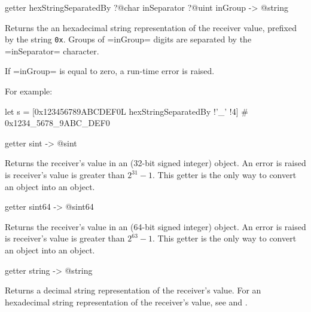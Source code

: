 
\begin{galgas}
getter hexStringSeparatedBy ?@char inSeparator ?@uint inGroup -> @string
\end{galgas}

Returns the an hexadecimal string representation of the receiver value, prefixed by the string \texttt{0x}. Groups of \ggs=inGroup= digits are separated by the \ggs=inSeparator= character.

If \ggs=inGroup= is equal to zero, a run-time error is raised.

For example:
\begin{galgas}
let s = [0x123456789ABCDEF0L hexStringSeparatedBy !'_' !4] # 0x1234_5678_9ABC_DEF0
\end{galgas}






\begin{galgas}
getter sint -> @sint
\end{galgas}

Returns the receiver's value in an  (32-bit signed integer) object. An error is raised is receiver's value is greater than $2^{31}-1$. This getter is the only way to convert an  object into an  object.




\begin{galgas}
getter sint64 -> @sint64
\end{galgas}

Returns the receiver's value in an  (64-bit signed integer) object. An error is raised is receiver's value is greater than $2^{63}-1$. This getter is the only way to convert an  object into an  object.



\begin{galgas}
getter string -> @string
\end{galgas}

Returns a decimal string representation of the receiver's value. For an hexadecimal string representation of the receiver's value, see  and .



